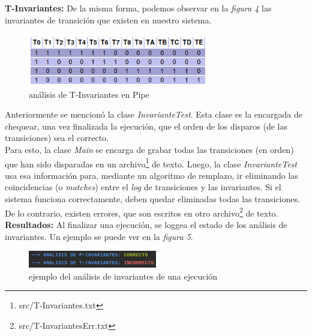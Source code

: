 \documentclass{article}
\begin{document}
\begin{flushleft}
        \textbf{T-Invariantes:} \newline \newline
        De la misma forma, podemos observar en la \emph{figura 4} las invariantes de transición
        que existen en nuestro sistema. \\
        \begin{figure}[h]
            \includegraphics[width=0.7\textwidth, center]{t-invariante.png}
            \caption{análisis de T-Invariantes en Pipe}
        \end{figure}   
        Anteriormente se mencionó la clase \emph{InvarianteTest}. Esta clase es la encargada
        de chequear, una vez finalizada la ejecución, que el orden de los disparos (de las 
        transiciones) sea el correcto. \\
        Para esto, la clase \emph{Main} se encarga de grabar todas las transiciones (en orden) 
        que han sido disparadas en un archivo\footnote{src/T-Invariantes.txt} de texto. Luego, la
        clase \emph{InvarianteTest} usa esa información para, mediante un algoritmo de remplazo,
        ir eliminando las coincidencias (o \emph{matches}) entre el \emph{log} de transiciones y
        las invariantes. Si el sistema funciona correctamente, deben quedar eliminadas todas las
        transiciones. De lo contrario, existen errores, que son escritos en otro 
        archivo\footnote{src/T-InvariantesErr.txt} de texto. \newline \newline
        \textbf{Resultados:} \newline \newline
        Al finalizar una ejecución, se loggea el estado de los análisis de invariantes. Un ejemplo
        se puede ver en la \emph{figura 5}.
        \begin{figure}[h]
            \includegraphics[width=0.5\textwidth, center]{analisis-invariantes-ej.png}
            \caption{ejemplo del análisis de invariantes de una ejecución}
        \end{figure}

    \end{flushleft}
\end{document}
